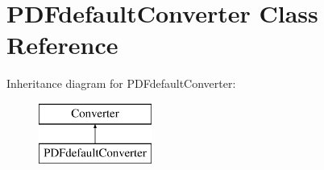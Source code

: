 \hypertarget{class_p_d_fdefault_converter}{\section{\-P\-D\-Fdefault\-Converter \-Class \-Reference}
\label{class_p_d_fdefault_converter}
}
\-Inheritance diagram for \-P\-D\-Fdefault\-Converter\-:\begin{figure}[H]
\begin{center}
\leavevmode
\includegraphics[height=2.000000cm]{class_p_d_fdefault_converter}
\end{center}
\end{figure}
